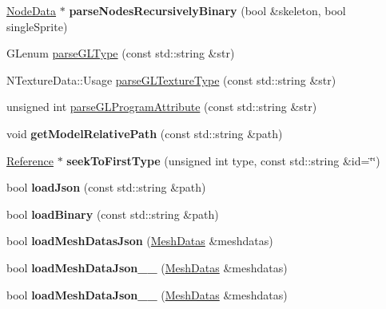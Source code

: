 \begin{DoxyCompactItemize}
\hyperlink{structNodeData}{Node\+Data} $\ast$ {\bfseries parse\+Nodes\+Recursively\+Binary} (bool \&skeleton, bool single\+Sprite)
\item 
G\+Lenum \hyperlink{classBundle3D_ada1b94dfaf386bba7c8014a2678da5fb}{parse\+G\+L\+Type} (const std\+::string \&str)
\item 
N\+Texture\+Data\+::\+Usage \hyperlink{classBundle3D_a467d6b0c572920193acd43365a7300d2}{parse\+G\+L\+Texture\+Type} (const std\+::string \&str)
\item 
unsigned int \hyperlink{classBundle3D_a0a7ca57fdb38995fa753d07beffb7501}{parse\+G\+L\+Program\+Attribute} (const std\+::string \&str)
\item 
\mbox{\label{classBundle3D_a767d59fd16f4c7d0e0c7b7d3350ae12e}} 
void {\bfseries get\+Model\+Relative\+Path} (const std\+::string \&path)
\item 
\mbox{\label{classBundle3D_aa3f5babb51bf4b02511ac3cec3bfec9b}} 
\hyperlink{structReference}{Reference} $\ast$ {\bfseries seek\+To\+First\+Type} (unsigned int type, const std\+::string \&id=\char`\"{}\char`\"{})
\item 
\mbox{\label{classBundle3D_a553e0dc85ddecccc99bc638e77cb612c}} 
bool {\bfseries load\+Json} (const std\+::string \&path)
\item 
\mbox{\label{classBundle3D_ab76b6bea00a0a651ba1df7346cae70ab}} 
bool {\bfseries load\+Binary} (const std\+::string \&path)
\item 
\mbox{\label{classBundle3D_ae12cd1944d7cf874a0d2f71df0991bc8}} 
bool {\bfseries load\+Mesh\+Datas\+Json} (\hyperlink{structMeshDatas}{Mesh\+Datas} \&meshdatas)
\item 
\mbox{\label{classBundle3D_a9d59ef3004556b7c949b1a8f1b72ada8}} 
bool {\bfseries load\+Mesh\+Data\+Json\+\_\+\_} (\hyperlink{structMeshDatas}{Mesh\+Datas} \&meshdatas)
\item 
\mbox{\label{classBundle3D_ad87b9d28a1d45cb977df126a57073bc4}} 
bool {\bfseries load\+Mesh\+Data\+Json\+\_\+\_} (\hyperlink{structMeshDatas}{Mesh\+Datas} \&meshdatas)
\item 
\mbox{\label{classBundle3D_ab9e41b6cd571717d4ffe73fe20eafb7f}} 

\end{DoxyCompactItemize}
